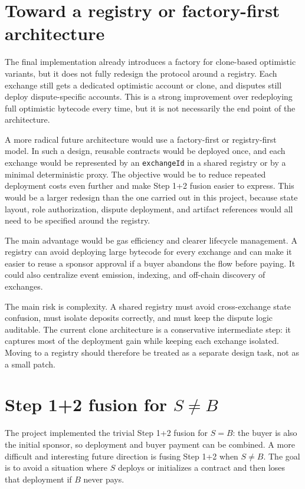 \section[Registry-first architecture]{Toward a registry or factory-first architecture}

The final implementation already introduces a factory for clone-based optimistic variants,
but it does not fully redesign the protocol around a registry. Each exchange still gets a
dedicated optimistic account or clone, and disputes still deploy dispute-specific accounts.
This is a strong improvement over redeploying full optimistic bytecode every time, but it
is not necessarily the end point of the architecture.

A more radical future architecture would use a factory-first or registry-first model. In
such a design, reusable contracts would be deployed once, and each exchange would be
represented by an \texttt{exchangeId} in a shared registry or by a minimal deterministic
proxy. The objective would be to reduce repeated deployment costs even further and make
Step 1+2 fusion easier to express. This would be a larger redesign than the one carried out
in this project, because state layout, role authorization, dispute deployment, and artifact
references would all need to be specified around the registry.

The main advantage would be gas efficiency and clearer lifecycle management. A registry can
avoid deploying large bytecode for every exchange and can make it easier to reuse a sponsor
approval if a buyer abandons the flow before paying. It could also centralize event
emission, indexing, and off-chain discovery of exchanges.

The main risk is complexity. A shared registry must avoid cross-exchange state confusion,
must isolate deposits correctly, and must keep the dispute logic auditable. The current
clone architecture is a conservative intermediate step: it captures most of the deployment
gain while keeping each exchange isolated. Moving to a registry should therefore be treated
as a separate design task, not as a small patch.

\section[Step 1+2 fusion for S not equal to B]{Step 1+2 fusion for \(S \neq B\)}

The project implemented the trivial Step 1+2 fusion for \(S=B\): the buyer is also the
initial sponsor, so deployment and buyer payment can be combined. A more difficult and
interesting future direction is fusing Step 1+2 when \(S \neq B\). The goal is to avoid a
situation where \(S\) deploys or initializes a contract and then loses that deployment if
\(B\) never pays.

